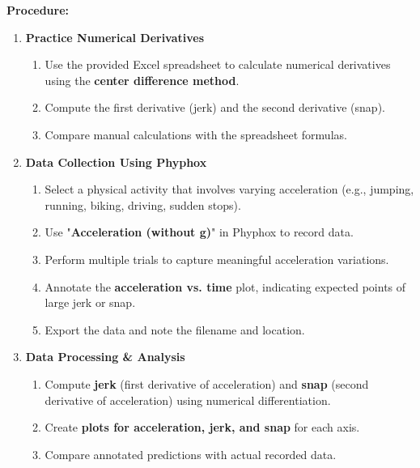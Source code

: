 \documentclass[idxtotoc,hyperref,openany]{labbook} %
\begin{document}
\hfill \break
\textbf{Procedure:}
\begin{enumerate}
    \item \textbf{Practice Numerical Derivatives}
    \begin{enumerate}[$\bullet$]
        \item Use the provided Excel spreadsheet to calculate numerical derivatives using the \textbf{center difference method}.
        \item Compute the first derivative (jerk) and the second derivative (snap).
        \item Compare manual calculations with the spreadsheet formulas.
    \end{enumerate}
    \item \textbf{Data Collection Using Phyphox}
    \begin{enumerate}[$\bullet$]
        \item Select a physical activity that involves varying acceleration (e.g., jumping, running, biking, driving, sudden stops).
        \item Use "\textbf{Acceleration (without g)}" in Phyphox to record data.
        \item Perform multiple trials to capture meaningful acceleration variations.
        \item Annotate the \textbf{acceleration vs. time} plot, indicating expected points of large jerk or snap.
        \item Export the data and note the filename and location.
    \end{enumerate}
    \item \textbf{Data Processing \& Analysis}
    \begin{enumerate}[$\bullet$]
        \item Compute \textbf{jerk} (first derivative of acceleration) and \textbf{snap} (second derivative of acceleration) using numerical differentiation.
        \item Create \textbf{plots for acceleration, jerk, and snap} for each axis.
        \item Compare annotated predictions with actual recorded data.
    \end{enumerate}
\end{enumerate}


\end{document}
